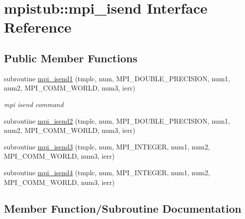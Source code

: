 \hypertarget{interfacempistub_1_1mpi__isend}{}\section{mpistub\+::mpi\+\_\+isend Interface Reference}
\label{interfacempistub_1_1mpi__isend}
\subsection*{Public Member Functions}
\begin{DoxyCompactItemize}
\item 
subroutine \mbox{\hyperlink{interfacempistub_1_1mpi__isend_aad745a3294df4d8372cdbe5e3bb0f995}{mpi\+\_\+isend1}} (tmplc, num, M\+P\+I\+\_\+\+D\+O\+U\+B\+L\+E\+\_\+\+P\+R\+E\+C\+I\+S\+I\+ON, num1, num2, M\+P\+I\+\_\+\+C\+O\+M\+M\+\_\+\+W\+O\+R\+LD, num3, ierr)
\begin{DoxyCompactList}\small\item\em mpi isend command \end{DoxyCompactList}\item 
subroutine \mbox{\hyperlink{interfacempistub_1_1mpi__isend_ae1f6f36eb6d625a18b723cd7d6f23378}{mpi\+\_\+isend2}} (tmplc, num, M\+P\+I\+\_\+\+D\+O\+U\+B\+L\+E\+\_\+\+P\+R\+E\+C\+I\+S\+I\+ON, num1, num2, M\+P\+I\+\_\+\+C\+O\+M\+M\+\_\+\+W\+O\+R\+LD, num3, ierr)
\item 
subroutine \mbox{\hyperlink{interfacempistub_1_1mpi__isend_a2beb83d18f2125185679e582401f6a12}{mpi\+\_\+isend3}} (tmplc, num, M\+P\+I\+\_\+\+I\+N\+T\+E\+G\+ER, num1, num2, M\+P\+I\+\_\+\+C\+O\+M\+M\+\_\+\+W\+O\+R\+LD, num3, ierr)
\item 
subroutine \mbox{\hyperlink{interfacempistub_1_1mpi__isend_af131acae622a106a363ddec117288f37}{mpi\+\_\+isend4}} (tmplc, num, M\+P\+I\+\_\+\+I\+N\+T\+E\+G\+ER, num1, num2, M\+P\+I\+\_\+\+C\+O\+M\+M\+\_\+\+W\+O\+R\+LD, num3, ierr)
\end{DoxyCompactItemize}


\subsection{Member Function/\+Subroutine Documentation}
\mbox{\label{interfacempistub_1_1mpi__isend_aad745a3294df4d8372cdbe5e3bb0f995}} 
